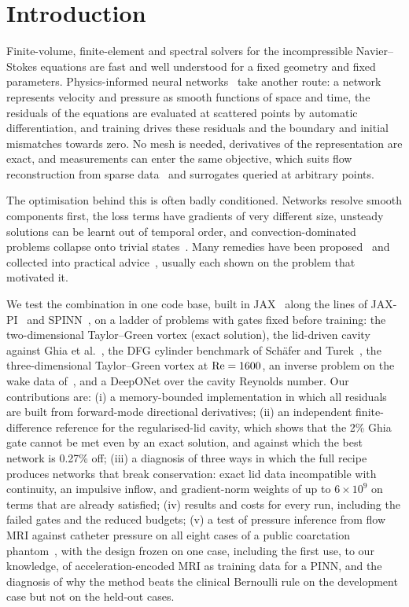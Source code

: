 \section{Introduction}
\label{sec:intro}
Finite-volume, finite-element and spectral solvers for the incompressible Navier--Stokes equations are fast and
well understood for a fixed geometry and fixed parameters. Physics-informed neural networks~\cite{raissi2019pinn}
take another route: a network represents velocity and pressure as smooth functions of space and time, the
residuals of the equations are evaluated at scattered points by automatic differentiation, and training drives
these residuals and the boundary and initial mismatches towards zero. No mesh is needed, derivatives of the
representation are exact, and measurements can enter the same objective, which suits flow reconstruction from
sparse data~\cite{raissi2020hfm} and surrogates queried at arbitrary points.

The optimisation behind this is often badly conditioned. Networks resolve smooth components first, the loss
terms have gradients of very different size, unsteady solutions can be learnt out of temporal order, and
convection-dominated problems collapse onto trivial
states~\cite{wang2021gradient,wang2022ntk,krishnapriyan2021failure}. Many remedies have been
proposed~\cite{tancik2020fourier,wang2022ntk,wang2024causality,wu2023rad,wang2022rwf,wang2024piratenets,jin2021nsfnets,
lagaris1998,sukumar2022distance,cho2023spinn,jagtap2020xpinn,lu2021deeponet,wang2021pideeponet,li2021fno} and
collected into practical advice~\cite{wang2023expert}, usually each shown on the problem that motivated it.

We test the combination in one code base, built in JAX~\cite{jax2018github} along the lines of
JAX-PI~\cite{jaxpi} and SPINN~\cite{spinncode}, on a ladder of problems with gates fixed before training: the
two-dimensional Taylor--Green vortex (exact solution), the lid-driven cavity against Ghia et
al.~\cite{ghia1982}, the DFG cylinder benchmark of Sch\"afer and Turek~\cite{schaefer1996}, the
three-dimensional Taylor--Green vortex at $\mathrm{Re}=1600$, an inverse problem on the wake data
of~\cite{raissi2019pinn}, and a DeepONet over the cavity Reynolds number. Our contributions are:
(i) a memory-bounded implementation in which all residuals are built from forward-mode directional derivatives;
(ii) an independent finite-difference reference for the regularised-lid cavity, which shows that the 2\% Ghia gate
cannot be met even by an exact solution, and against which the best network is 0.27\% off;
(iii) a diagnosis of three ways in which the full recipe produces networks that break conservation: exact lid
data incompatible with continuity, an impulsive inflow, and gradient-norm weights of up to $6\times10^9$ on
terms that are already satisfied; (iv) results and costs for every run, including the failed gates and the
reduced budgets; (v) a test of pressure inference from flow MRI against catheter pressure on all eight cases of a
public coarctation phantom~\cite{nair4dflowp}, with the design frozen on one case, including the first use, to our
knowledge, of acceleration-encoded MRI as training data for a PINN, and the diagnosis of why the method beats the
clinical Bernoulli rule on the development case but not on the held-out cases.
